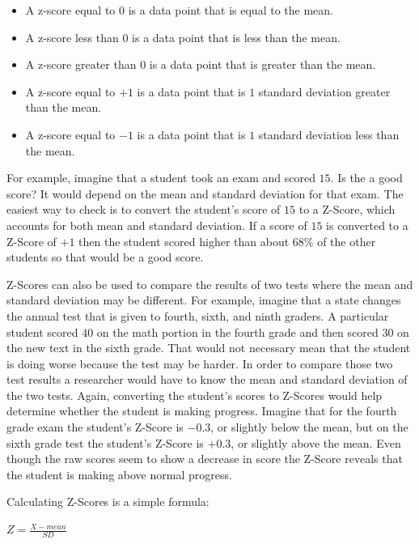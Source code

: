 \begin{itemize}
  \item A z-score equal to $ 0 $ is a data point that is equal to the mean.
  \item A z-score less than $ 0 $ is a data point that is less than the mean.
  \item A z-score greater than $ 0 $ is a data point that is greater than the mean.
  \item A z-score equal to $ +1 $ is a data point that is $ 1 $ standard deviation greater than the mean.
  \item A z-score equal to $ -1 $ is a data point that is $ 1 $ standard deviation less than the mean.
\end{itemize}

For example, imagine that a student took an exam and scored $ 15 $. Is the a good score? It would depend on the mean and standard deviation for that exam. The easiest way to check is to convert the student's score of $ 15 $ to a Z-Score, which accounts for both mean and standard deviation. If a score of $ 15 $ is converted to a Z-Score of $ +1 $ then the student scored higher than about $ 68\% $ of the other students so that would be a good score.

Z-Scores can also be used to compare the results of two tests where the mean and standard deviation may be different. For example, imagine that a state changes the annual test that is given to fourth, sixth, and ninth graders. A particular student scored $ 40 $ on the math portion in the fourth grade and then scored $ 30 $ on the new text in the sixth grade. That would not necessary mean that the student is doing worse because the test may be harder. In order to compare those two test results a researcher would have to know the mean and standard deviation of the two tests. Again, converting the student's scores to Z-Scores would help determine whether the student is making progress. Imagine that for the fourth grade exam the student's Z-Score is $ -0.3 $, or slightly below the mean, but on the sixth grade test the student's Z-Score is $ +0.3 $, or slightly above the mean. Even though the raw scores seem to show a decrease in score the Z-Score reveals that the student is making above normal progress.

Calculating Z-Scores is a simple formula:
 
\begin{center}
  $ Z = \frac{X - mean}{SD} $
\end{center}

